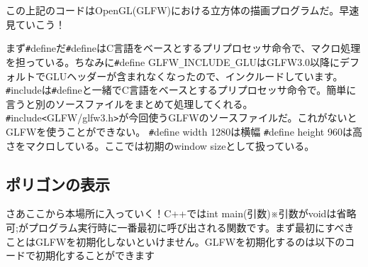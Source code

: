 \documentclass[a4paper,titlepage,dvipdfmx]{jsarticle}
\begin{document}
この上記のコードはOpenGL(GLFW)における立方体の描画プログラムだ。早速見ていこう！

まず\verb|#|defineだ\verb|#|defineはC言語をベースとするプリプロセッサ命令で、マクロ処理を担っている。ちなみに\verb|#|define GLFW\verb|_|INCLUDE\verb|_|GLUはGLFW3.0以降にデフォルトでGLUヘッダーが含まれなくなったので、インクルードしています。
\verb|#|includeは\verb|#|defineと一緒でC言語をベースとするプリプロセッサ命令で。簡単に言うと別のソースファイルをまとめて処理してくれる。
\verb|#|include\verb|<|GLFW/glfw3.h\verb|>|が今回使うGLFWのソースファイルだ。これがないとGLFWを使うことができない。
\verb|#|define width 1280は横幅 \verb|#|define height 960は高さをマクロしている。ここでは初期のwindow sizeとして扱っている。

\subsection{ポリゴンの表示}

さあここから本場所に入っていく！C++ではint main(引数)※引数がvoidは省略可;がプログラム実行時に一番最初に呼び出される関数です。まず最初にすべきことはGLFWを初期化しないといけません。GLFWを初期化するのは以下のコードで初期化することができます
\end{document}
